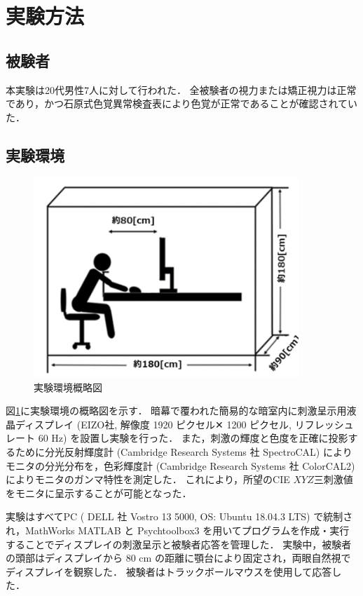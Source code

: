 \section{実験方法}
    \subsection{被験者}
        本実験は20代男性7人に対して行われた．
        全被験者の視力または矯正視力は正常であり，かつ石原式色覚異常検査表により色覚が正常であることが確認されていた．

    \subsection{実験環境}

        \begin{figure}[h]
            \centering
            \includegraphics[width=10.0cm]{./img/darkroom_p.png}
            \caption{実験環境概略図}
            \label{darkroom}
        \end{figure}

        図\ref{darkroom}に実験環境の概略図を示す．
        暗幕で覆われた簡易的な暗室内に刺激呈示用液晶ディスプレイ (EIZO社, 解像度 1920 ピクセル✕ 1200 ピクセル, リフレッシュレート 60 Hz) を設置し実験を行った．
        また，刺激の輝度と色度を正確に投影するために分光反射輝度計 (Cambridge Research Systems 社 SpectroCAL) によりモニタの分光分布を，色彩輝度計 (Cambridge Research Systems 社 ColorCAL2) によりモニタのガンマ特性を測定した．
        これにより，所望のCIE $XYZ$三刺激値をモニタに呈示することが可能となった．
        
        実験はすべてPC ( DELL 社 Vostro 13 5000, OS: Ubuntu 18.04.3 LTS) で統制され，MathWorks MATLAB と Psychtoolbox3\cite{Psychtoolbox} を用いてプログラムを作成・実行することでディスプレイの刺激呈示と被験者応答を管理した．
        実験中，被験者の頭部はディスプレイから 80 cm の距離に顎台により固定され，両眼自然視でディスプレイを観察した．
        被験者はトラックボールマウスを使用して応答した．

